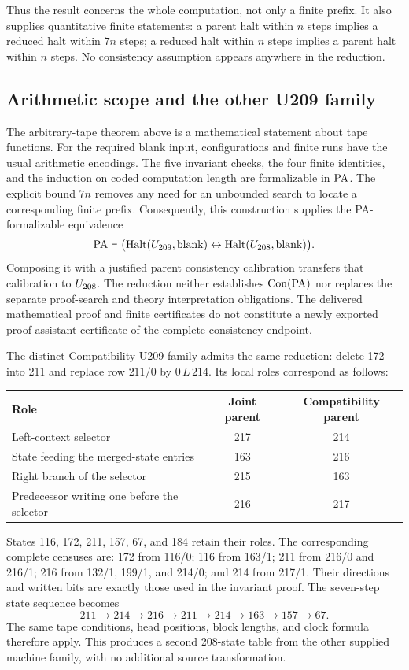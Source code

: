 Thus the result concerns the whole computation, not only a finite prefix.
It also supplies quantitative finite statements: a parent halt within $n$
steps implies a reduced halt within $7n$ steps; a reduced halt within $n$
steps implies a parent halt within $n$ steps. No consistency assumption
appears anywhere in the reduction.

\subsection{Arithmetic scope and the other U209 family}
\label{subsec:local208-scope}

The arbitrary-tape theorem above is a mathematical statement about tape
functions. For the required blank input, configurations and finite runs
have the usual arithmetic encodings. The five invariant checks, the four
finite identities, and the induction on coded computation length are
formalizable in $\mathrm{PA}$. The explicit bound $7n$ removes any need for an
unbounded search to locate a corresponding finite prefix. Consequently,
this construction supplies the PA-formalizable equivalence
\[
 \mathrm{PA}\vdash
 \bigl(\operatorname{Halt}(U_{209},\mathrm{blank})
       \leftrightarrow\operatorname{Halt}(U_{208},\mathrm{blank})\bigr).
\]
Composing it with a justified parent consistency calibration transfers
that calibration to $U_{208}$. The reduction neither establishes
$\operatorname{Con}(\mathrm{PA})$ nor replaces the separate proof-search and theory
interpretation obligations. The delivered mathematical proof and finite
certificates do not constitute a newly exported proof-assistant certificate
of the complete consistency endpoint.

The distinct Compatibility U209 family admits the same reduction:
delete 172 into 211 and replace row $211/0$ by $0\,L\,214$.
Its local roles correspond as follows:
\begin{center}
\begin{tabular}{lcc}
\toprule
Role & Joint parent & Compatibility parent\\
\midrule
Left-context selector & 217 & 214\\
State feeding the merged-state entries & 163 & 216\\
Right branch of the selector & 215 & 163\\
Predecessor writing one before the selector & 216 & 217\\
\bottomrule
\end{tabular}
\end{center}
States 116, 172, 211, 157, 67, and 184 retain their roles. The corresponding
complete censuses are: 172 from 116/0; 116 from 163/1; 211 from 216/0
and 216/1; 216 from 132/1, 199/1, and 214/0; and 214 from 217/1.
Their directions and written bits are exactly those used in the invariant
proof. The seven-step state sequence becomes
\[
 211\to214\to216\to211\to214\to163\to157\to67.
\]
The same tape conditions, head positions, block lengths, and clock formula
therefore apply. This produces a second 208-state table from the other
supplied machine family, with no additional source transformation.
